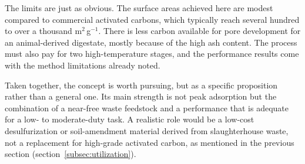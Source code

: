 \vspace{0.3em}

The limits are just as obvious. The surface areas achieved here are modest compared to commercial activated carbons, which typically reach several hundred to over a thousand m$^2$\,g$^{-1}$. There is less carbon available for pore development for an animal-derived digestate, mostly because of the high ash content. The process must also pay for two high-temperature stages, and the performance results come with the method limitations already noted.

\vspace{0.3em}
Taken together, the concept is worth pursuing, but as a specific proposition rather than a general one. Its main strength is not peak adsorption but the combination of a near-free waste feedstock and a performance that is adequate for a low- to moderate-duty task. A realistic role would be a low-cost desulfurization or soil-amendment material derived from slaughterhouse waste, not a replacement for high-grade activated carbon, as mentioned in the previous section (section~\ref{subsec:utilization}).

